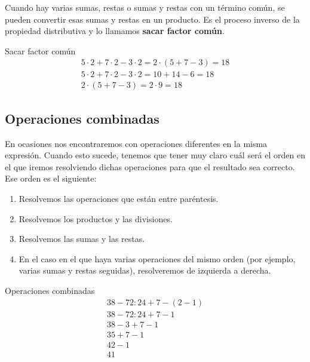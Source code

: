 \vspace{3mm}
Cuando hay varias sumas, restas o sumas y restas con un término común, se pueden convertir esas sumas y restas en un producto. Es el proceso inverso de la propiedad distributiva y lo llamamos \textbf{sacar factor común}.

\begin{ejemplos}[label={Ejemplo:factorcomun}]{Sacar factor común}
    \begin{gather*}
        5 \cdot 2 + 7 \cdot 2 - 3 \cdot 2 = 2 \cdot (5 + 7 - 3) = 18 \\
        5 \cdot 2 + 7 \cdot 2 - 3 \cdot 2 = 10 + 14 - 6 = 18 \\
        2 \cdot (5 + 7 - 3) = 2 \cdot 9 = 18
    \end{gather*}
\end{ejemplos}

\subsection{Operaciones combinadas}

En ocasiones nos encontraremos con operaciones diferentes en la misma expresión. Cuando esto sucede, tenemos que tener muy claro cuál será el orden en el que iremos resolviendo dichas operaciones para que el resultado sea correcto. Ese orden es el siguiente:

\begin{enumerate}
    \item Resolvemos las operaciones que están entre paréntesis.
    \item Resolvemos los productos y las divisiones.
    \item Resolvemos las sumas y las restas.
    \item En el caso en el que haya varias operaciones del mismo orden (por ejemplo, varias sumas y restas seguidas), resolveremos de izquierda a derecha.
\end{enumerate}

\begin{ejemplos}[label={Ejemplo:operacionescombinadas}]{Operaciones combinadas}
    \begin{gather*}
        38 - 72 : 24 + 7 - (2 - 1) \\
        38 - 72 : 24 + 7 - 1 \\
        38 - 3 + 7 - 1 \\
        35 + 7 - 1 \\
        42 - 1 \\
        41
    \end{gather*}
\end{ejemplos}


